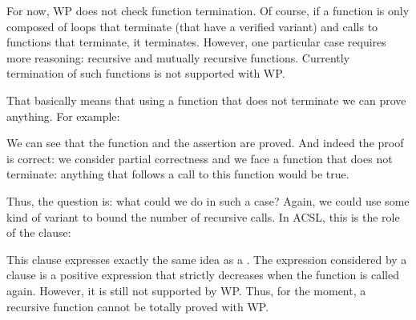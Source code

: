 For now, WP does not check function termination. Of course, if a function is
only composed of loops that terminate (that have a verified variant) and
calls to functions that terminate, it terminates. However, one particular
case requires more reasoning: recursive and mutually recursive functions.
Currently termination of such functions is not supported with WP.



That basically means that using a function that does not terminate we can
prove anything. For example:







We can see that the function and the assertion are proved. And indeed the
proof is correct: we consider partial correctness and we face a function
that does not terminate: anything that follows a call to this function would
be true.



Thus, the question is: what could we do in such a case? Again, we could use
some kind of variant to bound the number of recursive calls. In ACSL, this is
the role of the  clause:




This clause expresses exactly the same idea as a .
The expression considered by a  clause is a positive
expression that strictly decreases when the function is called again. However,
it is still not supported by WP. Thus, for the moment, a recursive function
cannot be totally proved with WP.
